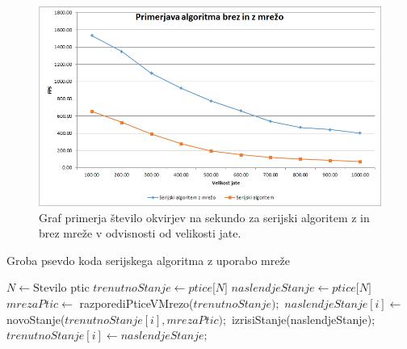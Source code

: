 \documentclass[a4paper, 12pt]{book}
\begin{document}
\begin{figure}[t]
\includegraphics[width=\textwidth]{graf_serial_alg}
\caption{Graf primerja število okvirjev na sekundo za serijski algoritem z in brez mreže v odvisnosti od velikosti jate.}
\label{img:graf_serial_alg}
\centering
\end{figure}

\begin{algorithm}
\caption{Groba psevdo koda serijskega algoritma z uporabo mreže}\label{serial_grid_pseudo_code}
\begin{algorithmic}[1]
\State $N \gets \text{Stevilo ptic}$
\State $trenutnoStanje \gets \textit{ptice[N]}$
\State $naslendjeStanje \gets \textit{ptice[N]}$
\Loop
\State $mrezaPtic \gets$ razporediPticeVMrezo($trenutnoStanje);$
\State $naslendjeStanje[i] \gets$ novoStanje($trenutnoStanje[i], mrezaPtic);$
\EndFor
\State izrisiStanje(naslendjeStanje);
\State $trenutnoStanje[i] \gets naslendjeStanje;$
\EndLoop
\end{algorithmic}
\end{algorithm}
\end{document}
